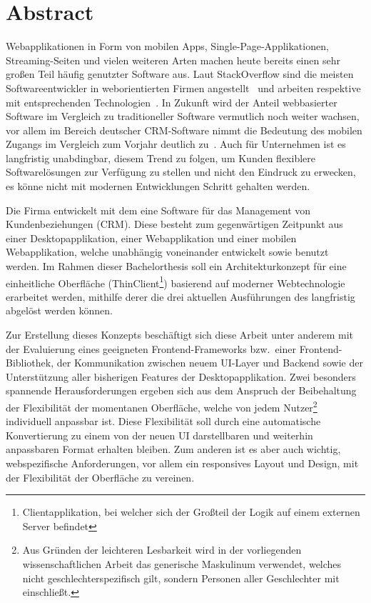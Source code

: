 \chapter{Abstract}

Webapplikationen in Form von mobilen Apps, Single-Page-Applikationen, Streaming-Seiten und vielen weiteren Arten machen heute bereits einen sehr großen Teil häufig genutzter Software aus. Laut StackOverflow sind die meisten Softwareentwickler in weborientierten Firmen angestellt~\parencite*{stackoverflow_survey_company_2018} und arbeiten respektive mit entsprechenden Technologien~\parencite*{stackoverflow_survey_technologies_2018}.
In Zukunft wird der Anteil webbasierter Software im Vergleich zu traditioneller Software vermutlich noch weiter wachsen, vor allem im Bereich deutscher CRM-Software nimmt die Bedeutung des mobilen Zugangs im Vergleich zum Vorjahr deutlich zu~\parencite[vgl.][]{bahr_capterra_2019}.
Auch für Unternehmen ist es langfristig unabdingbar, diesem Trend zu folgen, um Kunden flexiblere Softwarelösungen zur Verfügung zu stellen und nicht den Eindruck zu erwecken, es könne nicht mit modernen Entwicklungen Schritt gehalten werden.

Die Firma  entwickelt mit dem  eine Software für das Management von Kundenbeziehungen (\gls{CRM}). Diese besteht zum gegenwärtigen Zeitpunkt aus einer Desktopapplikation, einer Webapplikation und einer mobilen Webapplikation, welche unabhängig voneinander entwickelt sowie benutzt werden.
Im Rahmen dieser Bachelorthesis soll ein Architekturkonzept für eine einheitliche Oberfläche (ThinClient\footnote{Clientapplikation, bei welcher sich der Großteil der Logik auf einem externen Server befindet}) basierend auf moderner Webtechnologie erarbeitet werden, mithilfe derer die drei aktuellen Ausführungen des  langfristig abgelöst werden können.

Zur Erstellung dieses Konzepts beschäftigt sich diese Arbeit unter anderem mit der Evaluierung eines geeigneten Frontend-Frameworks bzw.\ einer Frontend-Bibliothek, der Kommunikation zwischen neuem UI-Layer und Backend sowie der Unterstützung aller bisherigen Features der Desktopapplikation.
Zwei besonders spannende Herausforderungen ergeben sich aus dem Anspruch der Beibehaltung der Flexibilität der momentanen Oberfläche, welche von jedem Nutzer\footnote{Aus Gründen der leichteren Lesbarkeit wird in der vorliegenden wissenschaftlichen Arbeit das generische Maskulinum verwendet, welches nicht geschlechterspezifisch gilt, sondern Personen aller Geschlechter mit einschließt.} individuell anpassbar ist. Diese Flexibilität soll durch eine automatische Konvertierung zu einem von der neuen UI darstellbaren und weiterhin anpassbaren Format erhalten bleiben. Zum anderen ist es aber auch wichtig, webspezifische Anforderungen, vor allem ein responsives Layout und Design, mit der Flexibilität der Oberfläche zu vereinen.
